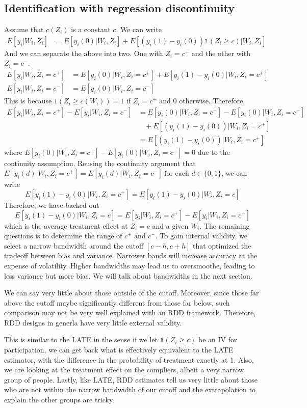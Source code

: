\documentclass[12pt]{article}
\theoremstyle{definition}
\theoremstyle{property}
\theoremstyle{assumption}
\theoremstyle{example}
\theoremstyle{comment}
\begin{document}
\subsection{Identification with regression discontinuity}
 Assume that $c(Z_i)$ is a constant $c$. We can write
\begin{align*}
E[y_i|W_i, Z_i]&=E[y_i(0)|W_i, Z_i]+E[(y_i(1)-y_i(0))\mathbb{1}(Z_i\geq c)|W_i, Z_i]
\end{align*}
And we can separate the above into two. One with $Z_i=c^+$ and the other with $Z_i=c^-$.
\begin{align*}
E[y_i|W_i, Z_i=c^+]&=E[y_i(0)|W_i, Z_i=c^+]+E[y_i(1)-y_i(0)|W_i, Z_i=c^+]\\
E[y_i|W_i, Z_i=c^-]&=E[y_i(0)|W_i, Z_i=c^-]
\end{align*}
This is because $1(Z_i\geq c(W_i))=1$ if $Z_i=c^+$ and 0 otherwise. Therefore, 
\begin{align*}
E[y_i|W_i, Z_i=c^+] - E[y_i|W_i, Z_i=c^-]&=E[y_i(0)|W_i, Z_i=c^+]-E[y_i(0)|W_i, Z_i=c^-]\\
 &\ \ \ \ +E[(y_i(1)-y_i(0))|W_i, Z_i=c^+]\\
 &=E[(y_i(1)-y_i(0))|W_i, Z_i=c^+]
\end{align*}
where $E[y_i(0)|W_i, Z_i=c^+]-E[y_i(0)|W_i, Z_i=c^-]=0$ due to the continuity assumption. Reusing the continuity argument that $E[y_i(d)|W_i, Z_i=c^+]=E[y_i(d)|W_i, Z_i=c^-] \ \text{for each } d\in\{0,1\}$, we can write  
\[
E[y_i(1)-y_i(0)|W_i, Z_i=c^+]=E[y_i(1)-y_i(0)|W_i, Z_i=c]
\]
Therefore, we have backed out
\[
E[y_i(1)-y_i(0)|W_i, Z_i=c]=E[y_i|W_i, Z_i=c^+] - E[y_i|W_i, Z_i=c^-]
\]
which is the average treatment effect at $Z_i=c$ and a given $W_i$. The remaining questions is to determine the range of $c^+$ and $c^-$. To gain internal validity, we select a narrow bandwidth around the cutoff $[c-h, c+h]$ that optimized the tradeoff between bias and variance. Narrower bands will increase accuracy at the expense of volatility. Higher bandwidths may lead us to oversmoothe, leading to less variance but more bias. We will talk about bandwidths in the next section.\par
We can say very little about those outside of the cutoff. Moreover, since those far above the cutoff maybe significantly different from those far below, such comparison may not be very well explained with an RDD framework. Therefore, RDD designs in generla have very little external validity. \par
This is similar to the LATE in the sense if we let $\mathbb{1}(Z_i\geq c)$ be an IV for participation, we can get back what is effectively equivalent to the LATE estimator, with the difference in the probability of treatment exactly at 1. Also, we are looking at the treatment effect on the compliers, albeit a very narrow group of people. Lastly, like LATE, RDD estimates tell us very little about those who are not within the narrow bandwidth of our cutoff and the extrapolation to explain the other groups are tricky. 
\end{document}

